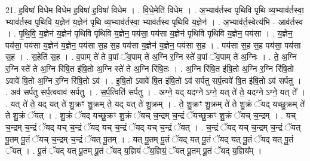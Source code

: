 \documentclass[17pt]{extarticle}
\begin{document}
21. ह॒विषा॑ विधेम विधेम ह॒विषा॑ ह॒विषा॑ विधेम । . वि॒धे॒मेति॑ विधेम । . अ॒भ्याव॑र्तस्व पृथिवि पृथि व्य॒भ्याव॑र्तस्वा॒ भ्याव॑र्तस्व पृथिवि य॒ज्ञेन॑ य॒ज्ञेन॑ पृथि व्य॒भ्याव॑र्तस्वा॒ भ्याव॑र्तस्व पृथिवि य॒ज्ञेन॑ । . अ॒भ्याव॑र्त॒स्वेत्य॑भि - आव॑र्तस्व । . पृ॒थि॒वि॒ य॒ज्ञेन॑ य॒ज्ञेन॑ पृथिवि पृथिवि य॒ज्ञेन॒ पय॑सा॒ पय॑सा य॒ज्ञेन॑ पृथिवि पृथिवि य॒ज्ञेन॒ पय॑सा । . य॒ज्ञेन॒ पय॑सा॒ पय॑सा य॒ज्ञेन॑ य॒ज्ञेन॒ पय॑सा स॒ह स॒ह पय॑सा य॒ज्ञेन॑ य॒ज्ञेन॒ पय॑सा स॒ह । . पय॑सा स॒ह स॒ह पय॑सा॒ पय॑सा स॒ह । . स॒हेति॑ स॒ह । . व॒पाम् ते॑ ते व॒पां ॅव॒पाम् ते॑ अ॒ग्नि र॒ग्नि स्ते॑ व॒पां ॅव॒पाम् ते॑ अ॒ग्निः । . ते॒ अ॒ग्नि र॒ग्नि स्ते॑ ते अ॒ग्नि रि॑षि॒त इ॑षि॒तो अ॒ग्नि स्ते॑ ते अ॒ग्नि रि॑षि॒तः । . अ॒ग्नि रि॑षि॒त इ॑षि॒तो अ॒ग्नि र॒ग्नि रि॑षि॒तो ऽवावे॑ षि॒तो अ॒ग्नि र॒ग्नि रि॑षि॒तो ऽव॑ । . इ॒षि॒तो ऽवावे॑ षि॒त इ॑षि॒तो ऽव॑ सर्पतु सर्प॒त्ववे॑ षि॒त इ॑षि॒तो ऽव॑ सर्पतु । . अव॑ सर्पतु सर्प॒त्ववाव॑ सर्पतु । . स॒र्प॒त्विति॑ सर्पतु । . अग्ने॒ यद् यदग्ने ऽग्ने॒ यत् ते॑ ते॒ यदग्ने ऽग्ने॒ यत् ते᳚ । . यत् ते॑ ते॒ यद् यत् ते॑ शु॒क्रꣳ शु॒क्रम् ते॒ यद् यत् ते॑ शु॒क्रम् । . ते॒ शु॒क्रꣳ शु॒क्रम् ते॑ ते शु॒क्रं ॅयद् यच्छु॒क्रम् ते॑ ते शु॒क्रं ॅयत् । . शु॒क्रं ॅयद् यच्छु॒क्रꣳ शु॒क्रं ॅयच् च॒न्द्रम् च॒न्द्रं ॅयच्छु॒क्रꣳ शु॒क्रं ॅयच् च॒न्द्रम् । . यच् च॒न्द्रम् च॒न्द्रं ॅयद् यच् च॒न्द्रं ॅयद् यच् च॒न्द्रं ॅयद् यच् च॒न्द्रं ॅयत् । . च॒न्द्रं ॅयद् यच् च॒न्द्रम् च॒न्द्रं ॅयत् पू॒तम् पू॒तं ॅयच् च॒न्द्रम् च॒न्द्रं ॅयत् पू॒तम् । . यत् पू॒तम् पू॒तं ॅयद् यत् पू॒तं ॅयद् यत् पू॒तं ॅयद् यत् पू॒तं ॅयत् । . पू॒तं ॅयद् यत् पू॒तम् पू॒तं ॅयद् य॒ज्ञियं॑ ॅय॒ज्ञियं॒ ॅयत् पू॒तम् पू॒तं ॅयद् य॒ज्ञिय᳚म् । \newline
\end{document}
